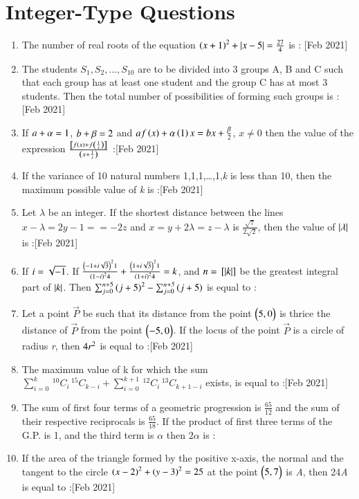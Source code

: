 \documentclass[journal,12pt,onecolumn]{IEEEtran}
\newcommand{\nCr}[2]{\,^{#1}C_{#2}}
\theoremstyle{remark}
\begin{document}
		\section{Integer-Type Questions}
\begin{enumerate}
	\item The number of real roots of the equation $ \left(x+1\right)^2 + \left\vert x-5\right\vert = \frac{27}{4} $ is : \hfill{[Feb 2021]}
	\item The students $S_1, S_2, \dots, S_{10}$ are to be divided into 3 groups A, B and C such that each group has at least one student and the group C has at most 3 students. Then the total number of possibilities of forming such groups is :\hfill{[Feb 2021]}
	\item If $ \emph{a} + \alpha = 1 $, $ \emph{b} + \beta = 2 $ and $af\left(x\right) + \alpha\left(1\right){x} = bx + \frac{\beta}{2} $, $ x\neq0 $ then the value of the expression $\frac{{}\left[f\left(x\right) + f\left(\frac{1}{x}\right)\right]}{\left(x + \frac{1}{x}\right)}$ :\hfill{[Feb 2021]}
	\item If the variance of 10 natural numbers 1,1,1,\dots,1,\emph{k} is less than 10, then the maximum possible value of \emph{k} is :\hfill{[Feb 2021]}
	\item Let $\lambda$ be an integer. If the shortest distance between the lines $ x - \lambda = 2y - 1 = = -2z $ and $ x = y + 2\lambda = z - \lambda $ is $\frac{\sqrt{7}}{2\sqrt{2}}$, then the value of $\left\vert\lambda\right\vert$ is :\hfill{[Feb 2021]}
	\item If $ \emph{i} = \sqrt{-1} $. If $ \frac{\left(-1+\emph{i}\sqrt{3}\right)^21}{\left(1-\emph{i}\right)^24} + \frac{\left(1+\emph{i}\sqrt{3}\right)^21}{\left(1+\emph{i}\right)^24} = \emph{k}$, and $ \emph{n} = {}\left[\left\vert\emph{k}\right\vert\right]$ be the greatest integral part of $\left\vert\emph{k}\right\vert$. Then $ \sum_{j=0}^{\emph{n}+5} \left(j+5\right)^2 - \sum_{j=0}^{\emph{n+5}} \left(j+5\right) $ is equal to :
	\item Let a point $\vec{P}$ be such that its distance from the point $\begin{pmatrix}5,0\end{pmatrix}$ is thrice the distance of $\vec{P}$ from the point $\begin{pmatrix}-5,0\end{pmatrix}$. If the locus of the point $\vec{P}$ is a circle of radius \emph{r}, then $4\emph{r}^2$ is equal to :\hfill{[Feb 2021]}
	\item The maximum value of k for which the sum $ \sum_{i=0}^{k} \nCr{10}{i} \nCr{15}{k-i} + \sum_{i=0}^{k+1} \nCr{12}{i} \nCr{13}{k+1-i} $ exists, is equal to :\hfill{[Feb 2021]}

	\item The sum of first four terms of a geometric progression is $\frac{65}{12}$ and the sum of their respective reciprocals is $\frac{65}{18}$. If the product of first three terms of the G.P. is 1, and the third term is $\alpha$ then $2\alpha$ is :

	\item If the area of the triangle formed by the positive x-axis, the normal and the tangent to the circle $\left(x-2\right)^2 + \left(y-3\right)^2 = 25$ at the point $\begin{pmatrix}5,7\end{pmatrix}$ is \emph{A}, then 24\emph{A} is equal to :\hfill{[Feb 2021]}
\end{enumerate}
 
\end{document}
